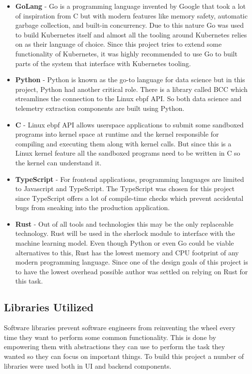 \begin{itemize}
    \item \textbf{GoLang} - Go is a programming language invented by Google that took a lot of inspiration from C but with modern features like memory safety, automatic garbage collection, and built-in concurrency. Due to this nature Go was used to build Kubernetes itself and almost all the tooling around Kubernetes relies on as their language of choice. Since this project tries to extend some functionality of Kubernetes, it was highly recommended to use Go to built parts of the system that interface with Kubernetes tooling.
    \item \textbf{Python} - Python is known as the go-to language for data science but in this project, Python had another critical role. There is a library called BCC which streamlines the connection to the Linux \ac{ebpf} API. So both data science and telemetry extraction components are built using Python.
    \item \textbf{C} - Linux \ac{ebpf} API allows userspace applications to submit some sandboxed programs into kernel space at runtime and the kernel responsible for compiling and executing them along with kernel calls. But since this is a Linux kernel feature all the sandboxed programs need to be written in C so the kernel can understand it.
    \item \textbf{TypeScript} - For frontend applications, programming languages are limited to Javascript and TypeScript. The TypeScript was chosen for this project since TypeScript offers a lot of compile-time checks which prevent accidental bugs from sneaking into the production application.
    \item \textbf{Rust} - Out of all tools and technologies this may be the only replaceable technology. Rust will be used in the \ac{sherlock} module to interface with the machine learning model. Even though Python or even Go could be viable alternatives to this, Rust has the lowest memory and CPU footprint of any modern programming language. Since one of the design goals of this project is to have the lowest overhead possible author was settled on relying on Rust for this task.
\end{itemize}



\subsection{Libraries Utilized}
Software libraries prevent software engineers from reinventing the wheel every time they want to perform some common functionality. This is done by empowering them with abstractions they can use to perform the task they wanted so they can focus on important things. To build this project a number of libraries were used both in UI and backend components.


